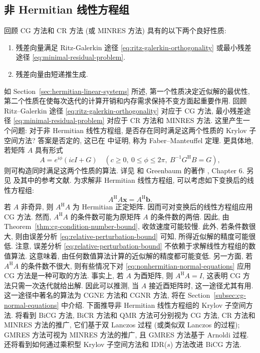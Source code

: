 \subsection{{非 Hermitian 线性方程组}}\label{sec:nonhermitian-linear-systems}
{回顾 CG 方法和 CR 方法 (或 MINRES 方法) 具有的以下两个良好性质:}
\begin{enumerate}
\item{残差向量满足 Ritz-Galerkin 途径 \eqref{eq:ritz-galerkin-orthogonality} 或最小残差途径 \eqref{eq:minimal-residual-problem}.}
\item{残差向量由短递推生成.}
\end{enumerate}
{如 Section\ \ref{sec:hermitian-linear-systems} 所述, 第一个性质决定近似解的最优性, 第二个性质在使每次迭代的计算开销和内存需求保持不变方面起重要作用. 回顾 Ritz--Galerkin 途径 \eqref{eq:ritz-galerkin-orthogonality} 对应于 CG 方法, 最小残差途径 \eqref{eq:minimal-residual-problem} 对应于 CR 方法和 MINRES 方法.}
{这里产生一个问题: 对于非 Hermitian 线性方程组, 是否存在同时满足这两个性质的 Krylov 子空间方法? 答案是否定的, 这已在  中证明, 称为 Faber--Manteuffel 定理. 更具体地, 若矩阵 $A$ 具有形式}
\[A=e^{i\phi}(icI+G)\quad(c\ge0,\ 0\le\phi\le2\pi,\ B^{-1}G^{\mathrm H}B=G),\]
{则可构造同时满足这两个性质的算法. 详见  和 Greenbaum 的著作 , Chapter 6. 另见  及其中的参考文献.}
{为求解非 Hermitian 线性方程组, 可以考虑如下变换后的线性方程组:}
\begin{equation}\label{eq:nonhermitian-normal-equations}A^{\mathrm H}A\bm x=A^{\mathrm H}\bm b.\end{equation}
{若 $A$ 非奇异, 则 $A^{\mathrm H}A$ 为 Hermitian 正定矩阵. 因而可对变换后的线性方程组应用 CG 方法. 然而, $A^{\mathrm H}A$ 的条件数可能为原矩阵 $A$ 的条件数的两倍. 因此, 由 Theorem\ \ref{thm:cg-condition-number-bound}, 收敛速度可能较慢. 此外, 若条件数很大, 则由误差分析 \eqref{eq:relative-perturbation-bound} 可知, 所得近似解的精度可能很低. 注意, 误差分析 \eqref{eq:relative-perturbation-bound} 不依赖于求解线性方程组的数值算法. 这意味着, 由任何数值算法计算的近似解的精度都可能变低.}
{另一方面, 若 $A^{\mathrm H}A$ 的条件数不很大, 则有些情况下对 \eqref{eq:nonhermitian-normal-equations} 应用 CG 方法是一种可取的方法. 事实上, 若 $A$ 为酉矩阵, 则 $A^{\mathrm H}A=I$, 这表明 CG 方法只需一次迭代就给出解. 因此可以推测, 当 $A$ 接近酉矩阵时, 这一途径尤其有用. 这一途径中著名的算法为 CGNE 方法和 CGNR 方法, 将在 Section\ \ref{subsec:cg-normal-equations} 中介绍.}
{下面推导非 Hermitian 线性方程组的 Krylov 子空间方法. 将看到 BiCG 方法, BiCR 方法和 QMR 方法可分别视为 CG 方法, CR 方法和 MINRES 方法的推广, 它们基于双 Lanczos 过程 (或类似双 Lanczos 的过程); GMRES 方法可视为 MINRES 方法的推广, 且 GMRES 方法基于 Arnoldi 过程. 还将看到如何通过乘积型 Krylov 子空间方法和 IDR($s$) 方法改进 BiCG 方法.}
